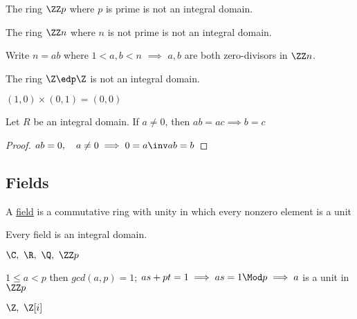 \begin{example}
  The ring \(\ZZ p\) where \(p\) is prime is not an integral domain.
\end{example}

\begin{nonexample}
  The ring \(\ZZ n\) where \(n\) is not prime is not an integral domain.
  \begin{note}
    Write \(n=ab\) where \(1<a,b<n\) \(\implies\) \(a,b\) are both zero-divisors in \(\ZZ n\).
  \end{note}
\end{nonexample}

\begin{nonexample}
  The ring \(\Z \edp \Z\) is not an integral domain.
  \begin{note}
    \((1,0)\times(0,1) = (0,0)\)
  \end{note}
\end{nonexample}

\begin{theorem}[Cancellation]
  Let \(R\) be an integral domain. If \(a\neq 0\), then \(ab=ac\implies b=c\)
\end{theorem}

\begin{proof}
  \(ab = 0,\quad a\neq 0 \implies 0=a\inv ab = b\)
\end{proof}

\subsection{Fields}
\begin{definition}[Field]
  A \ul{field} is a commutative ring with unity in which every nonzero element is a unit
\end{definition}

\begin{fact}
  Every field is an integral domain.
\end{fact}

\begin{examples}
  \(\C,\ \R,\ \Q,\ \ZZ p\)
  \begin{note}[\(\ZZ p\)]
    \(1\leq a < p\) then \(gcd(a,p) = 1\); \(as+pt=1 \implies as = 1 \Mod p \implies a\) is a unit in \(\ZZ p\)
  \end{note}
\end{examples}

\begin{nonexamples}
  \(\Z,\ \Z[i]\)
\end{nonexamples}

